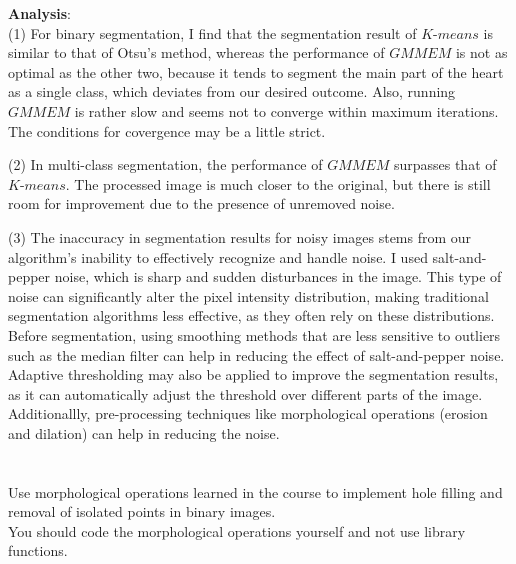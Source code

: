 \documentclass[UTF8]{ctexart}
\begin{document}
\textbf{Analysis}:\\
(1) For binary segmentation, I find that the segmentation result of $\textit{K-means}$ is similar to that of Otsu's method, whereas the performance of $\textit{GMMEM}$ is not as optimal as the other two,
because it tends to segment the main part of the heart as a single class, which deviates from our desired outcome. Also, running $\textit{GMMEM}$
is rather slow and seems not to converge within maximum iterations.
The conditions for covergence may be a little strict. 

(2) In multi-class segmentation, the performance of $\textit{GMMEM}$ surpasses that of $\textit{K-means}$. 
The processed image is much closer to the original, but there is still room for improvement due to the presence of unremoved noise.

(3) The inaccuracy in segmentation results for noisy images stems from our algorithm's inability to effectively recognize and handle noise. 
I used salt-and-pepper noise, which is sharp and sudden disturbances in the image. 
This type of noise can significantly alter the pixel intensity distribution, making traditional segmentation algorithms less effective, as they often rely on these distributions.\\
Before segmentation, using smoothing methods that are less sensitive to outliers such as the median filter can help in reducing the effect of salt-and-pepper noise.
Adaptive thresholding may also be applied to improve the segmentation results, as it can automatically adjust the threshold  over different parts of the image.
Additionallly, pre-processing techniques like morphological operations (erosion and dilation) can help in reducing the noise. 

\section{}
Use morphological operations learned in the course to implement hole filling and removal of isolated points in binary images.\\
You should code the morphological operations yourself and not use library functions.\\
\end{document}

